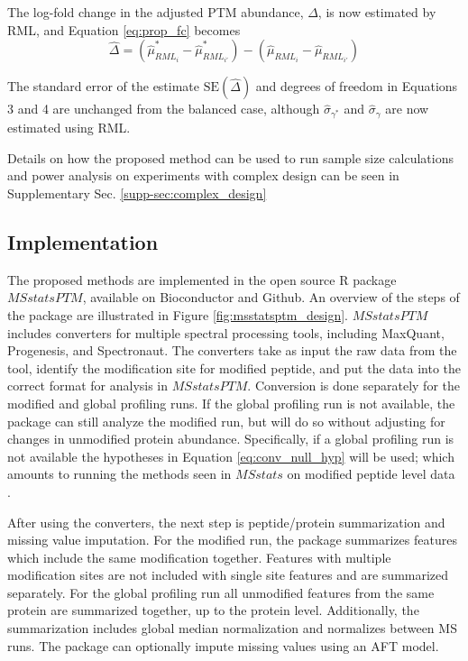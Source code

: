 \documentclass[mcp]{article}
\numberwithin{table}{section}
\begin{document}
The log-fold change in the adjusted PTM abundance, $\Delta$, is now estimated by RML, and Equation \ref{eq:prop_fc} becomes 
\begin{equation}
\hat{\Delta} = (\hat{\mu}_{RML_i}^{\ast} - \hat{\mu}_{RML_{i'}}^{\ast}) - (\hat{\mu}_{RML_i} - \hat{\mu}_{RML_{i'}})
\end{equation}

The standard error of the estimate $\mathrm{SE}(\hat{\Delta})$ and degrees of freedom in Equations 3 and 4 are unchanged from the balanced case, although $\hat{\sigma}_{\gamma^\ast}$ and $\hat{\sigma}_{\gamma}$ are now estimated using RML.

Details on how the proposed method can be used to run sample size calculations and power analysis on experiments with complex design can be seen in Supplementary Sec. \ref{supp-sec:complex_design}

\subsection*{Implementation}

The proposed methods are implemented in the open source R package $MSstatsPTM$, available on Bioconductor and Github. An overview of the steps of the package are illustrated in Figure \ref{fig:msstatsptm_design}. $MSstatsPTM$ includes converters for multiple spectral processing tools, including MaxQuant, Progenesis, and Spectronaut. The converters take as input the raw data from the tool, identify the modification site for modified peptide, and put the data into the correct format for analysis in $MSstatsPTM$. Conversion is done separately for the modified and global profiling runs. If the global profiling run is not available, the package can still analyze the modified run, but will do so without adjusting for changes in unmodified protein abundance. Specifically, if a global profiling run is not available the hypotheses in Equation \ref{eq:conv_null_hyp} will be used; which amounts to running the methods seen in $MSstats$ on modified peptide level data \cite{Choi:2014} \cite{Huang:2020}.

After using the converters, the next step is peptide/protein summarization and missing value imputation. For the modified run, the package summarizes features which include the same modification together. Features with multiple modification sites are not included with single site features and are summarized separately. For the global profiling run all unmodified features from the same protein are summarized together, up to the protein level. Additionally, the summarization includes global median normalization and normalizes between MS runs. The package can optionally impute missing values using an AFT model.
\end{document}
